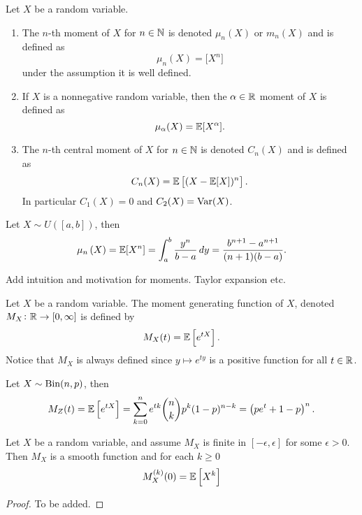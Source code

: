 \documentclass[11pt,a4paper]{article}
\begin{document}
  \begin{definition}[Moments]
    Let $X$ be a random variable.
    \begin{enumerate}
      \item The $n$-th moment of $X$ for $n \in \mathbb{N}$ is denoted $\mu_n(X)$ or
      $m_n(X)$ and is defined as
      \[
        \mu_n(X) = \mathbf[X^n]
      \]
      under the assumption it is well defined.
      \item If $X$ is a nonnegative random variable, then the $\alpha \in \mathbb{R}$
      moment of $X$ is defined as
      \[
        \mu_\alpha(X) = \mathbb{E}[X^{\alpha}].
      \]
      \item The $n$-th central moment of $X$ for $n \in \mathbb{N}$ is denoted
      $C_n(X)$ and is defined as
      \[
        C_n(X) = \mathbb{E}\left[(X - \mathbb{E}[X])^n\right].
      \]
      In particular $C_1(X) = 0$ and $C_2(X) = \operatorname{Var}(X)$.
    \end{enumerate}
  \end{definition}

  \begin{example}
    Let $X \sim U([a,b])$, then
    \[
      \mu_{n} \left(X\right) =
      \mathbb{E}[X^{n}] =
      \int_{a}^{b}{\frac{y^{n}}{b-a}}\,dy =
      {\frac{b^{n+1}-a^{n+1}}{(n+1)(b-a)}}.
    \]
  \end{example}
  
  Add intuition and motivation for moments. Taylor expansion etc.

  \begin{definition}
    Let $X$ be a random variable. The moment generating function of $X$,
    denoted $M_X \colon \mathbb{R} \to [0,\infty]$ is defined by
    \[
      M_X(t) = \mathbb{E}\left[e^{tX}\right].
    \]
    Notice that $M_X$ is always defined since $y \mapsto e^{ty}$ is a positive
    function for all $t \in \mathbb{R}$.
  \end{definition}

  \begin{example}
    Let $X \sim \operatorname{Bin}(n,p)$, then
    \[
      M_Z(t) =
      \mathbb{E}\left[e^{tX}\right] =
      \sum_{k=0}^{n}e^{t k}{\binom{n}{k}}p^{k}(1-p)^{n-k} =
      \left(p e^{t}+1-p\right)^{n}.
    \]
  \end{example}

  \begin{proposition}
    Let $X$ be a random variable, and assume $M_X$ is finite in 
    $[-\epsilon, \epsilon]$ for some $\epsilon > 0$. Then $M_X$ is a smooth
    function and for each $k \geq 0$
    \[
      M_X^{(k)}(0) = \mathbb{E}\left[X^k\right]
    \]
  \end{proposition}
  \begin{proof}
    To be added.
  \end{proof}
\end{document}
